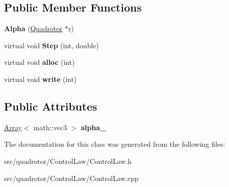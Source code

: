 \subsection*{\-Public \-Member \-Functions}
\begin{DoxyCompactItemize}
\item 
\hypertarget{classCL_1_1Alpha_a7144b55588a6fdd8d6e6270230c510a5}{{\bfseries \-Alpha} (\hyperlink{classQuadrotor}{\-Quadrotor} $\ast$r)}\label{classCL_1_1Alpha_a7144b55588a6fdd8d6e6270230c510a5}

\item 
\hypertarget{classCL_1_1Alpha_a3abee3653d7af651347097e67824151f}{virtual void {\bfseries \-Step} (int, double)}\label{classCL_1_1Alpha_a3abee3653d7af651347097e67824151f}

\item 
\hypertarget{classCL_1_1Alpha_a5425efcdfe00976a373a66fda1b51faa}{virtual void {\bfseries alloc} (int)}\label{classCL_1_1Alpha_a5425efcdfe00976a373a66fda1b51faa}

\item 
\hypertarget{classCL_1_1Alpha_a5c69fe1c1de2576c2db2c7724eaf909a}{virtual void {\bfseries write} (int)}\label{classCL_1_1Alpha_a5c69fe1c1de2576c2db2c7724eaf909a}

\end{DoxyCompactItemize}
\subsection*{\-Public \-Attributes}
\begin{DoxyCompactItemize}
\item 
\hypertarget{classCL_1_1Alpha_a27d343cf1970d5a561169bd8533d427b}{\hyperlink{classArray}{\-Array}$<$ math\-::vec3 $>$ {\bfseries alpha\-\_\-}}\label{classCL_1_1Alpha_a27d343cf1970d5a561169bd8533d427b}

\end{DoxyCompactItemize}


\-The documentation for this class was generated from the following files\-:\begin{DoxyCompactItemize}
\item 
src/quadrotor/\-Control\-Law/\-Control\-Law.\-h\item 
src/quadrotor/\-Control\-Law/\-Control\-Law.\-cpp\end{DoxyCompactItemize}
